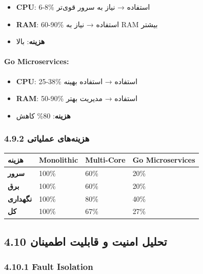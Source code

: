 \documentclass[
]{article}
\newcounter{none} %
\providecommand{\tightlist}{%
  \setlength{\itemsep}{0pt}\setlength{\parskip}{0pt}}
\begin{document}
\begin{itemize}
\tightlist
\item
  \textbf{CPU}: 6-8\% استفاده → نیاز به سرور قوی‌تر
\item
  \textbf{RAM}: 60-90\% استفاده → نیاز به RAM بیشتر
\item
  \textbf{هزینه}: بالا
\end{itemize}

\paragraph{Go Microservices:}\label{go-microservices-1}

\begin{itemize}
\tightlist
\item
  \textbf{CPU}: 25-38\% استفاده → استفاده بهینه
\item
  \textbf{RAM}: 50-90\% استفاده → مدیریت بهتر
\item
  \textbf{هزینه}: 80\% کاهش
\end{itemize}

\subsubsection{4.9.2 هزینه‌های
عملیاتی}\label{ux647ux632ux6ccux646ux647ux647ux627ux6cc-ux639ux645ux644ux6ccux627ux62aux6cc}

{\def\LTcaptype{none} %
\begin{longtable}[]{@{}llll@{}}
\toprule\noalign{}
هزینه & Monolithic & Multi-Core & Go Microservices \\
\midrule\noalign{}
\endhead
\bottomrule\noalign{}
\endlastfoot
\textbf{سرور} & 100\% & 60\% & 20\% \\
\textbf{برق} & 100\% & 60\% & 20\% \\
\textbf{نگهداری} & 100\% & 80\% & 40\% \\
\textbf{کل} & 100\% & 67\% & 27\% \\
\end{longtable}
}

\subsection{4.10 تحلیل امنیت و قابلیت
اطمینان}\label{ux62aux62dux644ux6ccux644-ux627ux645ux646ux6ccux62a-ux648-ux642ux627ux628ux644ux6ccux62a-ux627ux637ux645ux6ccux646ux627ux646}

\subsubsection{4.10.1 Fault Isolation}\label{fault-isolation}
\end{document}
